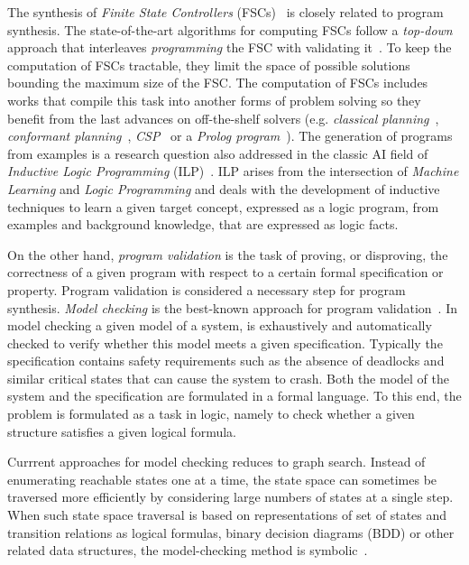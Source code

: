 \documentclass[10pt,a4paper]{paper}
\begin{document}
The synthesis of {\it Finite State Controllers} (FSCs)~\cite{geffner:policies:IJCAI15} is closely related to program synthesis. The state-of-the-art algorithms for computing FSCs follow a {\it top-down} approach that interleaves {\it programming} the FSC with validating it~\cite{sergio:aprograming:ijcai16}. To keep the computation of FSCs tractable, they limit the space of possible solutions bounding the maximum size of the FSC. The computation of FSCs includes works that compile this task into another forms of problem solving so they benefit from the last advances on off-the-shelf solvers (e.g. {\em classical planning}~\cite{sergio:aprograming:icaps16}, {\em conformant planning}~\cite{Geffner:FSM:AAAI10}, {\em CSP}~\cite{Infantes:FSC:ECAI2010} or a {\em Prolog program}~\cite{Giacomo:FSM:ICAPS13}). The generation of programs from examples is a research question also addressed in the classic AI field of {\em Inductive Logic Programming} (ILP)~\cite{muggleton1991inductive,Raedt:relationalML:book2008}. ILP arises from the intersection of {\em Machine Learning} and {\em Logic Programming} and deals with the development of inductive techniques to learn a given target concept, expressed as a  logic program,  from  examples  and  background  knowledge, that are expressed as logic facts.

On the other hand, {\em program validation} is the task of proving, or disproving, the correctness of a given program with respect to a certain formal specification or property. Program validation is considered a necessary step for program synthesis. {\em Model checking} is the best-known approach for program validation~\cite{clarke1999model}. In model checking a given model of a system, is exhaustively and automatically checked to verify  whether this model meets a given specification. Typically the specification contains safety requirements such as the absence of deadlocks and similar critical states that can cause the system to crash. Both the model of the system and the specification are formulated in a formal language. To this end, the problem is formulated as a task in logic, namely to check whether a given structure satisfies a given logical formula. 

Currrent approaches for model checking reduces to graph search. Instead of enumerating reachable states one at a time, the state space can sometimes be traversed more efficiently by considering large numbers of states at a single step. When such state space traversal is based on representations of set of states and transition relations as logical formulas, binary decision diagrams (BDD) or other related data structures, the model-checking method is symbolic~\cite{mcmillan1993symbolic}.
\end{document}
